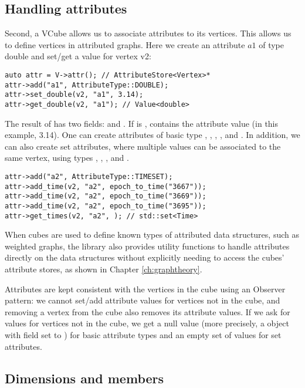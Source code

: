 \subsection{Handling attributes}

Second, a VCube allows us to associate attributes to its vertices. This allows us to define vertices in attributed graphs. Here we create an attribute $a1$ of type double and set/get a value for vertex v2:
\begin{lstlisting}[style=c++]
auto attr = V->attr(); // AttributeStore<Vertex>*
attr->add("a1", AttributeType::DOUBLE); 
attr->set_double(v2, "a1", 3.14);
attr->get_double(v2, "a1"); // Value<double>
\end{lstlisting}
The result of  has two fields:  and . If  is ,  contains the attribute value (in this example, 3.14). One can create attributes of basic type , , , , and . In addition, we can also create set attributes, where multiple values can be associated to the same vertex, using types , , , and .
\begin{lstlisting}[style=c++]
attr->add("a2", AttributeType::TIMESET); 
attr->add_time(v2, "a2", epoch_to_time("3667"));
attr->add_time(v2, "a2", epoch_to_time("3669"));
attr->add_time(v2, "a2", epoch_to_time("3695"));
attr->get_times(v2, "a2", ); // std::set<Time>
\end{lstlisting}
When cubes are used to define known types of attributed data structures, such as weighted graphs, the library also provides utility functions to handle attributes directly on the data structures without explicitly needing to access the cubes' attribute stores, as shown in Chapter \ref{ch:graphtheory}.

Attributes are kept consistent with the vertices in the cube using an Observer pattern: we cannot set/add attribute values for vertices not in the cube, and removing a vertex from the cube also removes its attribute values. If we ask for values for vertices not in the cube, we get a null value (more precisely, a  object with field  set to ) for basic attribute types and an empty set of values for set attributes.

\subsection{Dimensions and members}

